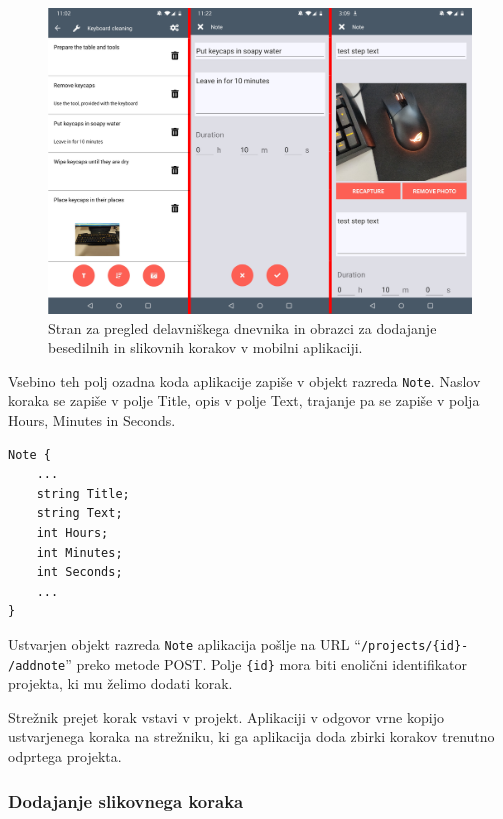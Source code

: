 \documentclass[a4paper, 12pt]{book}
\begin{document}
\begin{figure}[H]
\begin{center}
	\includegraphics[width=13.5cm]{app_project_note}
\end{center}
	\caption{Stran za pregled delavniškega dnevnika in obrazci za dodajanje besedilnih in slikovnih korakov v mobilni aplikaciji.}
\label{app_project_note}
\end{figure}

Vsebino teh polj ozadna koda aplikacije zapiše v objekt razreda \texttt{Note}.
Naslov koraka se zapiše v polje Title, opis v polje Text, trajanje pa se zapiše v polja Hours, Minutes in Seconds.
\begin{verbatim}
Note { 
    ... 
    string Title; 
    string Text; 
    int Hours; 
    int Minutes;
    int Seconds;
    ...
}
\end{verbatim}

Ustvarjen objekt razreda \texttt{Note} aplikacija pošlje na URL \enquote{\texttt{/projects/\{id\}-\\/addnote}} preko metode POST.
Polje \texttt{\{id\}} mora biti enolični identifikator projekta, ki mu želimo dodati korak.

Strežnik prejet korak vstavi v projekt.
Aplikaciji v odgovor vrne kopijo ustvarjenega koraka na strežniku, ki ga aplikacija doda zbirki korakov trenutno odprtega projekta.



\subsubsection{Dodajanje slikovnega koraka}
\end{document}

